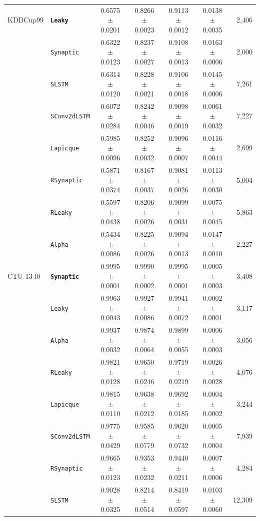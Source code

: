 \begin{table}[t]
{\begin{tabular}{l l c c c c r}
KDDCup99 & \textbf{\texttt{Leaky}} & 0.6575 $\pm$ 0.0201 & 0.8266 $\pm$ 0.0023 & 0.9113 $\pm$ 0.0012 & 0.0138 $\pm$ 0.0035 & 2{,}406 \\
 & \texttt{Synaptic} & 0.6322 $\pm$ 0.0123 & 0.8237 $\pm$ 0.0027 & 0.9108 $\pm$ 0.0013 & 0.0163 $\pm$ 0.0006 & 2{,}000 \\
 & \texttt{SLSTM} & 0.6314 $\pm$ 0.0120 & 0.8228 $\pm$ 0.0021 & 0.9106 $\pm$ 0.0018 & 0.0145 $\pm$ 0.0006 & 7{,}261 \\
 & \texttt{SConv2dLSTM} & 0.6072 $\pm$ 0.0284 & 0.8242 $\pm$ 0.0046 & 0.9098 $\pm$ 0.0019 & 0.0061 $\pm$ 0.0032 & 7{,}227 \\
 & \texttt{Lapicque} & 0.5985 $\pm$ 0.0096 & 0.8252 $\pm$ 0.0032 & 0.9096 $\pm$ 0.0007 & 0.0116 $\pm$ 0.0044 & 2{,}699 \\
 & \texttt{RSynaptic} & 0.5871 $\pm$ 0.0374 & 0.8167 $\pm$ 0.0037 & 0.9081 $\pm$ 0.0026 & 0.0113 $\pm$ 0.0030 & 5{,}004 \\
 & \texttt{RLeaky} & 0.5597 $\pm$ 0.0438 & 0.8206 $\pm$ 0.0026 & 0.9099 $\pm$ 0.0031 & 0.0075 $\pm$ 0.0045 & 5{,}863 \\
 & \texttt{Alpha} & 0.5434 $\pm$ 0.0086 & 0.8225 $\pm$ 0.0026 & 0.9094 $\pm$ 0.0013 & 0.0147 $\pm$ 0.0010 & 2{,}227 \\
CTU-13 f0 & \textbf{\texttt{Synaptic}} & 0.9995 $\pm$ 0.0001 & 0.9990 $\pm$ 0.0002 & 0.9995 $\pm$ 0.0001 & 0.0005 $\pm$ 0.0003 & 3{,}408 \\
 & \texttt{Leaky} & 0.9963 $\pm$ 0.0043 & 0.9927 $\pm$ 0.0086 & 0.9941 $\pm$ 0.0072 & 0.0002 $\pm$ 0.0001 & 3{,}117 \\
 & \texttt{Alpha} & 0.9937 $\pm$ 0.0032 & 0.9874 $\pm$ 0.0064 & 0.9899 $\pm$ 0.0055 & 0.0006 $\pm$ 0.0003 & 3{,}056 \\
 & \texttt{RLeaky} & 0.9821 $\pm$ 0.0128 & 0.9650 $\pm$ 0.0246 & 0.9719 $\pm$ 0.0219 & 0.0026 $\pm$ 0.0028 & 4{,}076 \\
 & \texttt{Lapicque} & 0.9815 $\pm$ 0.0110 & 0.9638 $\pm$ 0.0212 & 0.9692 $\pm$ 0.0185 & 0.0004 $\pm$ 0.0002 & 3{,}244 \\
 & \texttt{SConv2dLSTM} & 0.9775 $\pm$ 0.0429 & 0.9585 $\pm$ 0.0779 & 0.9620 $\pm$ 0.0732 & 0.0005 $\pm$ 0.0004 & 7{,}939 \\
 & \texttt{RSynaptic} & 0.9665 $\pm$ 0.0123 & 0.9353 $\pm$ 0.0232 & 0.9440 $\pm$ 0.0211 & 0.0007 $\pm$ 0.0006 & 4{,}284 \\
 & \texttt{SLSTM} & 0.9028 $\pm$ 0.0325 & 0.8214 $\pm$ 0.0514 & 0.8419 $\pm$ 0.0597 & 0.0103 $\pm$ 0.0060 & 12{,}309 \\

\end{tabular}}
\end{table}
